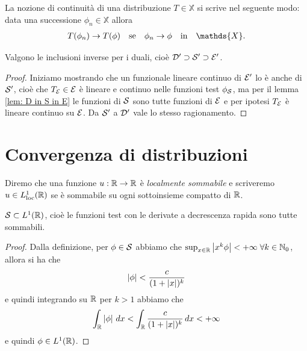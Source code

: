 La nozione di continuità di una distribuzione $ T \in \mathds{X} $ si scrive nel seguente modo: data una successione $ \phi_n \in \mathds{X} $ allora 
\begin{align}
  T(\phi_n) \to T(\phi) \quad \textnormal{se} \quad \phi_n \to \phi \quad \textnormal{in} \quad \mathds{X}.
\end{align}

\begin{lemma}[  ]
  Valgono le inclusioni inverse per i duali, cioè $ \D' \supset \S' \supset \E' $.
\end{lemma}
\begin{proof}
  Iniziamo mostrando che un funzionale lineare continuo di $ \E' $ lo è anche di $ \S' $, cioè che $ T_\E \in \E $ è lineare e continuo 
  nelle funzioni test $ \phi_\S $, ma per il lemma \ref{lem: D in S in E} le funzioni di $ \S $ sono tutte funzioni di $ \E $ e per ipotesi 
  $ T_\E $ è lineare continuo su $ \E $. Da $ \S' $ a $ \D' $ vale lo stesso ragionamento.
\end{proof}

\section{Convergenza di distribuzioni}

\begin{definition}
  Diremo che una funzione $ u:\R \to \R $ è \textit{localmente sommabile} e scriveremo $ u \in L_{\text{loc}}^1(\R) $ se è sommabile su ogni sottoinsieme 
  compatto di $ \R $.
\end{definition}

\begin{lemma}[  ] \label{lem: funzioni test sono L1} 
  $ \S \subset L^1(\R) $, cioè le funzioni test con le derivate a decrescenza rapida sono tutte sommabili.
\end{lemma}
\begin{proof}
  Dalla definizione, per $ \phi \in \S $ abbiamo che $ \sup_{x\in \R} \abs{x^k \phi} < +\infty \; \forall k \in \mathbb{N}_0 $, allora si ha che
  \begin{align}
    \abs{\phi} < \frac{c}{(1 + \abs{x})^k}
  \end{align}
  e quindi integrando su $ \R $ per $ k > 1 $ abbiamo che
  \begin{align}
    \int_\R \abs{\phi} \, dx < \int_\R \frac{c}{(1 + \abs{x})^k}  \, dx < +\infty 
  \end{align}
  e quindi $ \phi \in L^1(\R) $.
\end{proof}

